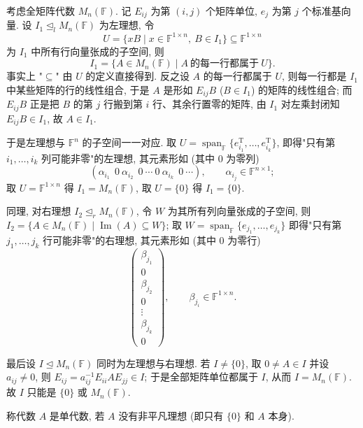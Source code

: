 \begin{example}\label{ex:matrix-left-ideals}
考虑全矩阵代数 $M_n(\mathbb{F})$. 记 $E_{ij}$ 为第 $(i,j)$ 个矩阵单位, $e_j$ 为第 $j$ 个标准基向量.
  设 $I_1\trianglelefteq_l M_n(\mathbb{F})$ 为左理想, 令
  \[
    U=\{xB \mid x\in \mathbb{F}^{1\times n},\ B\in I_1\}\subseteq \mathbb{F}^{1\times n}
  \]
  为 $I_1$ 中所有行向量张成的子空间, 则
  \[
    I_1=\{A\in M_n(\mathbb{F}) \mid A\ \text{的每一行都属于}\ U\}.
  \]
  事实上 "$\subseteq$" 由 $U$ 的定义直接得到. 反之设 $A$ 的每一行都属于 $U$,
  则每一行都是 $I_1$ 中某些矩阵的行的线性组合, 于是 $A$ 是形如 $E_{ij}B$ ($B\in I_1$) 的矩阵的线性组合;
  而 $E_{ij}B$ 正是把 $B$ 的第 $j$ 行搬到第 $i$ 行、其余行置零的矩阵, 由 $I_1$ 对左乘封闭知 $E_{ij}B\in I_1$,
  故 $A\in I_1$.

  于是左理想与 $\mathbb{F}^{n}$ 的子空间一一对应. 取 $U=\operatorname{span}_{\mathbb{F}}\{e_{i_1}^{\mathrm{T}},\dots,e_{i_k}^{\mathrm{T}}\}$,
  即得"只有第 $i_1,\dots,i_k$ 列可能非零"的左理想, 其元素形如 (其中 $0$ 为零列)
  \[
    \left(\alpha_{i_1}\ \ 0\ \alpha_{i_2}\ \ 0\ \cdots\ 0\ \alpha_{i_k}\ \ 0\ \cdots\right),
    \qquad \alpha_{i_j}\in \mathbb{F}^{n\times 1};
  \]
  取 $U=\mathbb{F}^{1\times n}$ 得 $I_1=M_n(\mathbb{F})$, 取 $U=\{0\}$ 得 $I_1=\{0\}$.

  同理, 对右理想 $I_2\trianglelefteq_r M_n(\mathbb{F})$, 令 $W$ 为其所有列向量张成的子空间, 则
  $I_2=\{A\in M_n(\mathbb{F})\mid \operatorname{Im}(A)\subseteq W\}$;
  取 $W=\operatorname{span}_{\mathbb{F}}\{e_{j_1},\dots,e_{j_k}\}$ 即得"只有第 $j_1,\dots,j_k$ 行可能非零"的右理想,
  其元素形如 (其中 $0$ 为零行)
  \[
    \begin{pmatrix}
      \beta_{j_1}\\ 0\\ \beta_{j_2}\\ 0\\ \vdots\\ \beta_{j_k}\\ 0
    \end{pmatrix},
    \qquad \beta_{j_i}\in \mathbb{F}^{1\times n}.
  \]

  最后设 $I\trianglelefteq M_n(\mathbb{F})$ 同时为左理想与右理想. 若 $I\neq\{0\}$, 取 $0\neq A\in I$
  并设 $a_{ij}\neq 0$, 则 $E_{ij}=a_{ij}^{-1}E_{ii}AE_{jj}\in I$;
  于是全部矩阵单位都属于 $I$, 从而 $I=M_n(\mathbb{F})$.
  故 $I$ 只能是 $\{0\}$ 或 $M_n(\mathbb{F})$.
\end{example}

\begin{definition}[单代数]\label{def:simple-algebra}
称代数 $A$ 是单代数, 若 $A$ 没有非平凡理想 (即只有 $\{0\}$ 和 $A$ 本身).
\end{definition}

